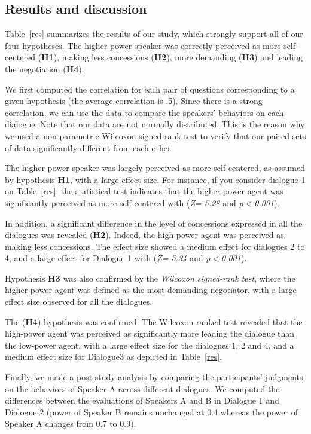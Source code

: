 \documentclass{llncs}
\begin{document}
		\subsection{Results and discussion}
			\vspace{-.5em} 
			Table~\ref{res} summarizes the results of our study, which strongly support all of our four hypotheses.  The higher-power speaker was correctly perceived as more self-centered (\textbf{H1}), making less concessions (\textbf{H2}), more demanding (\textbf{H3}) and leading the negotiation (\textbf{H4}).
			
			We first computed the correlation for each pair of questions corresponding to a given hypothesis (the average correlation is .5). Since there is a strong correlation, we can use the data to compare the speakers' behaviors on each dialogue. Note that our data are not normally distributed. This is the reason why we used a non-parametric Wilcoxon signed-rank test to verify that our paired sets of data significantly different from each other.
			 
			The higher-power speaker was largely perceived as more self-centered, as assumed by hypothesis \textbf{H1}, with a large effect size. For instance, if you consider dialogue 1 on Table~\ref{res}, the statistical test indicates that the higher-power agent was significantly perceived as more self-centered with (\emph{Z=-5.28} and \emph{p$<$0.001}).
			
			In addition, a significant difference in the level of concessions expressed in all the dialogues was revealed (\textbf{H2}). Indeed, the high-power agent was perceived as making less concessions. The effect size showed a medium effect for dialogues 2 to 4, and a large effect for Dialogue 1 with (\emph{Z=-5.34} and \emph{p$<$0.001}).
			 
			Hypothesis \textbf{H3} was also confirmed by the \emph{Wilcoxon signed-rank test}, where the higher-power agent was defined as the most demanding negotiator, with a large effect size observed for all the dialogues. 
			 
			The (\textbf{H4}) hypothesis was confirmed. The Wilcoxon ranked test revealed that the high-power agent was perceived as significantly more leading the dialogue than the low-power agent, with a large effect size for the dialogues 1, 2 and 4, and a medium effect size for Dialogue3 as depicted in Table~\ref{res}.
			
			\medskip
			Finally, we made a post-study analysis by comparing the participants' judgments on the behaviors of Speaker A across different dialogues. We computed the differences between the evaluations of Speakers A and B in Dialogue 1 and Dialogue 2 (power of Speaker B remains unchanged at 0.4 whereas the power of Speaker A changes from 0.7 to 0.9).
			
\end{document}
